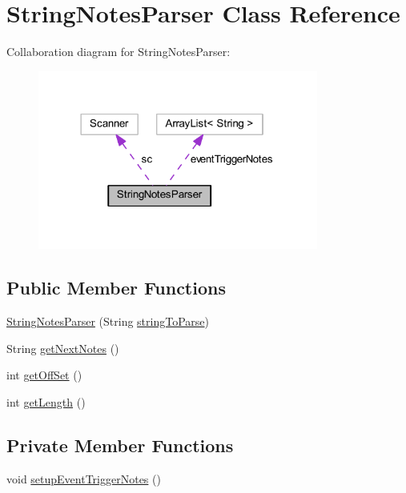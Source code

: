 \hypertarget{classcom_1_1lclion_1_1midiparser_1_1_string_notes_parser}{\section{String\+Notes\+Parser Class Reference}
\label{classcom_1_1lclion_1_1midiparser_1_1_string_notes_parser}
}


Collaboration diagram for String\+Notes\+Parser\+:\nopagebreak
\begin{figure}[H]
\begin{center}
\leavevmode
\includegraphics[width=261pt]{classcom_1_1lclion_1_1midiparser_1_1_string_notes_parser__coll__graph}
\end{center}
\end{figure}
\subsection*{Public Member Functions}
\begin{DoxyCompactItemize}
\item 
\hyperlink{classcom_1_1lclion_1_1midiparser_1_1_string_notes_parser_a598cb026a05b3ea58cc9d5b9124c0001}{String\+Notes\+Parser} (String \hyperlink{classcom_1_1lclion_1_1midiparser_1_1_string_notes_parser_affda1ac66ff7fe4869f395974d539adc}{string\+To\+Parse})
\item 
String \hyperlink{classcom_1_1lclion_1_1midiparser_1_1_string_notes_parser_a01b964ea248967218b88e1d6558592cd}{get\+Next\+Notes} ()
\item 
int \hyperlink{classcom_1_1lclion_1_1midiparser_1_1_string_notes_parser_a16e67d67362fc128a3bd84faccda8422}{get\+Off\+Set} ()
\item 
int \hyperlink{classcom_1_1lclion_1_1midiparser_1_1_string_notes_parser_aab0d4bbd0884d04dbe281cc2b9d21206}{get\+Length} ()
\end{DoxyCompactItemize}
\subsection*{Private Member Functions}
\begin{DoxyCompactItemize}
\item 
void \hyperlink{classcom_1_1lclion_1_1midiparser_1_1_string_notes_parser_a2c58052b399ad0a04348e645f46f527b}{setup\+Event\+Trigger\+Notes} ()
\end{DoxyCompactItemize}
